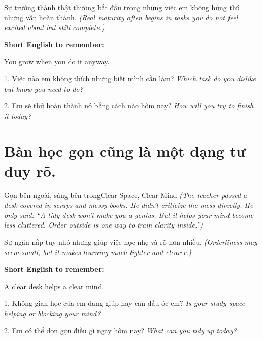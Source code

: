 \begin{baihoc}
Sự trưởng thành thật thường bắt đầu trong những việc em không hứng thú nhưng vẫn hoàn thành.
\textit{(Real maturity often begins in tasks you do not feel excited about but still complete.)}
\end{baihoc}

\begin{ghinhoanh}
\textbf{Short English to remember:}

You grow when you do it anyway.

\end{ghinhoanh}

\begin{tuhocnhanh}
1. Việc nào em không thích nhưng biết mình cần làm? \textit{Which task do you dislike but know you need to do?}

2. Em sẽ thử hoàn thành nó bằng cách nào hôm nay? \textit{How will you try to finish it today?}
\end{tuhocnhanh}
\ngancach

\section{Bàn học gọn cũng là một dạng tư duy rõ.}
\begin{truyen}{Gọn bên ngoài, sáng bên trong}{Clear Space, Clear Mind}
\textit{(The teacher passed a desk covered in scraps and messy books. He didn't criticize the mess directly. He only said: ``A tidy desk won't make you a genius. But it helps your mind become less cluttered. Order outside is one way to train clarity inside.'')}
\end{truyen}

\begin{baihoc}
Sự ngăn nắp tuy nhỏ nhưng giúp việc học nhẹ và rõ hơn nhiều.
\textit{(Orderliness may seem small, but it makes learning much lighter and clearer.)}
\end{baihoc}

\begin{ghinhoanh}
\textbf{Short English to remember:}

A clear desk helps a clear mind.

\end{ghinhoanh}

\begin{tuhocnhanh}
1. Không gian học của em đang giúp hay cản đầu óc em? \textit{Is your study space helping or blocking your mind?}

2. Em có thể dọn gọn điều gì ngay hôm nay? \textit{What can you tidy up today?}
\end{tuhocnhanh}
\ngancach

